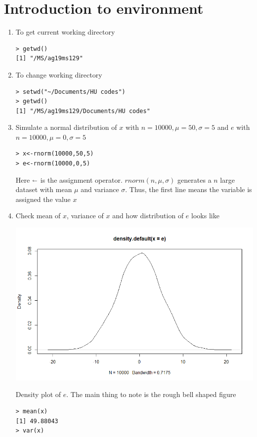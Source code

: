 \documentclass[notoc]{tufte-book}
\begin{document}
\section{Introduction to  environment}
\begin{enumerate}
    \item To get current working directory
    \begin{lstlisting}
> getwd()
[1] "/MS/ag19ms129"
    \end{lstlisting}
    \item To change working directory
    \begin{lstlisting}
> setwd("~/Documents/HU codes")
> getwd()
[1] "/MS/ag19ms129/Documents/HU codes"
    \end{lstlisting}
    \item Simulate a normal distribution of $x$ with 
$n=10000,\mu=50,\sigma=5$ and $e$ with $n=10000,\mu=0,\sigma=5$
\begin{lstlisting}
> x<-rnorm(10000,50,5)
> e<-rnorm(10000,0,5)
\end{lstlisting}
Here $\shortleftarrow$ is the assignment operator. $rnorm(n,\mu,\sigma)$ generates a $n$ large dataset with mean $\mu$ and variance $\sigma$. Thus, the first line means the variable is assigned the value $x$
\item Check mean of $x$, variance of $x$ and how distribution of $e$ looks like
\begin{marginfigure}
\includegraphics[width=\textwidth]{"c2s1p1.png"}
\caption{Density plot of $e$. The main thing to note is the rough bell shaped figure}
\end{marginfigure}
\begin{lstlisting}
> mean(x)
[1] 49.88043
> var(x)

\end{lstlisting}
\end{enumerate}
\end{document}
